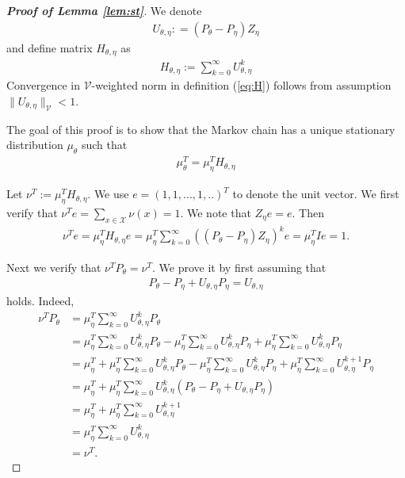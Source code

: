 \documentclass[11pt]{article}
\newcommand{\X}{\mathcal{X}}
\newcommand{\V}{\mathcal{V}}
\theoremstyle{definition}
\numberwithin{equation}{section}
\begin{document}
\begin{proof}[\textbf{Proof of Lemma \ref{lem:st}}]
We denote \begin{align}\label{eq:U}U_{\theta, \eta}: = (P_{\theta} - P_{\eta}) Z_{\eta}\end{align} and define matrix $H_{\theta, \eta}$ as
\begin{align}\label{eq:H}
H_{\theta,\eta} := \sum\limits_{k=0}^\infty U^k_{\theta, \eta}
\end{align}
Convergence in $\V$-weighted norm in definition (\ref{eq:H}) follows  from assumption $\|U_{\theta, \eta}\|_\V<1$.

The goal of this proof is to show that the Markov chain  has a unique stationary distribution $\mu_{\theta}$ such that  \begin{align}\label{eq:mu12}
\mu_{\theta}^T = \mu_{\eta}^T H_{\theta,\eta}\end{align}


Let $\nu^T :=  \mu_{\eta}^T H_{\theta,\eta}$.  We use $e = (1, 1, ...,1,..)^T$ to denote  the unit vector.  We first verify that $\nu^T e = \sum\limits_{x\in \X} \nu(x)=1.$ We note that  $Z_{\eta} e = e.$ Then
 \begin{align*}
 \nu ^T e = \mu_{\eta}^T H_{\theta,\eta} e =  \mu_\eta^T \sum\limits_{k=0}^\infty \left( (P_{\theta} - P_{\eta})Z_{\eta}\right)^k e  = \mu_\eta^T I e = 1.
 \end{align*}


  Next we verify that $\nu^T P_{\theta} = \nu^T.$ We prove it by first assuming
  that \begin{align}\label{eq:Pfinite}
  P_{\theta}- P_{\eta} + U_{\theta, \eta}  P_{\eta} = U_{\theta, \eta}\end{align}  holds. Indeed,
 \begin{align*}
\nu^T P_{\theta} &=\mu_{\eta}^T \sum\limits_{k=0}^\infty U_{\theta, \eta}^k P_{\theta} \\
&=   \mu_{\eta}^T \sum\limits_{k=0}^\infty U_{\theta, \eta}^k P_{\theta}- \mu_{\eta}^T \sum\limits_{k=0}^\infty U_{\theta, \eta}^k P_{\eta} + \mu_{\eta}^T \sum\limits_{k=0}^\infty U_{\theta, \eta}^{k} P_{\eta}\\
& =  \mu_{\eta}^T +   \mu_{\eta}^T \sum\limits_{k=0}^\infty U_{\theta, \eta}^k P_{\theta}- \mu_{\eta}^T \sum\limits_{k=0}^\infty U_{\theta, \eta}^k P_{\eta} + \mu_{\eta}^T \sum\limits_{k=0}^\infty U_{\theta, \eta}^{k+1} P_{\eta} \\
& =  \mu_{\eta} ^T+ \mu_{\eta}^T \sum\limits_{k=0}^\infty U_{\theta, \eta}^k (P_{\theta}- P_{\eta} + U_{\theta, \eta}  P_{\eta})\\
& =\mu_{\eta}^T + \mu_{\eta}^T \sum\limits_{k=0}^\infty U_{\theta, \eta}^{k+1}\\
& =\mu_{\eta}^T \sum\limits_{k=0}^\infty U_{\theta, \eta}^{k}\\
& = \nu^T.
 \end{align*}


\end{proof}
\end{document}
